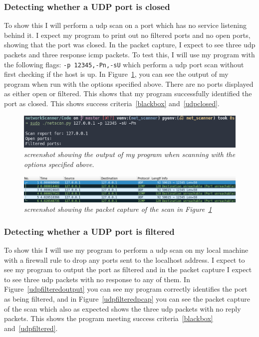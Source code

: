 \documentclass[titlepage]{article}
\let\Oldsubsubsection\subsubsection{}
\renewcommand{\subsubsection}{\FloatBarrier\Oldsubsubsection}
\begin{document}
\subsubsection{Detecting whether a UDP port is closed}
To show this I will perform a \gls{udp} scan on a port which
has no service listening behind it. I expect my program to print out
no filtered ports and no open ports, showing that the port was closed.
In the packet capture, I expect to see three \gls{udp} packets and three response
\gls{icmp} packets. To test this, I will use my program with the following flags:
\verb|-p 12345,-Pn,-sU| which perform a \gls{udp} port scan without first checking
if the host is up. In Figure~\ref{udpclosedoutput}, you can see the output of my program
when run with the options specified above.
There are no ports displayed as either open or filtered.
This shows that my program successfully identified the port as closed.
This shows success criteria~\ref{blackbox} and~\ref{udpclosed}.

\begin{figure}[H]
  \centering
  \includegraphics[width=\textwidth]{udpclosedoutput.png}
  \caption{\textit{%
    screenshot showing the output of my program when scanning with the
    options specified above.
}}\label{udpclosedoutput}
\end{figure}

\begin{figure}[H]
  \centering
  \includegraphics[width=\textwidth]{udpclosedpcap.png}
  \caption{\textit{%
    screenshot showing the packet capture of the scan in Figure~\ref{udpclosedoutput}
}}\label{udpclosedcap}
\end{figure}

\subsubsection{Detecting whether a UDP port is filtered}
To show this I will use my program to perform a \gls{udp} scan on my local machine
with a firewall rule to drop any ports sent to the localhost address. I expect to see
my program to output the port as filtered and in the packet capture I expect to see
three \gls{udp} packets with no response to any of them.
In Figure~\ref{udpfilteredoutput} you can see my program correctly identifies
the port as being filtered, and in Figure~\ref{udpfilteredpcap} you can see
the packet capture of the scan which also as expected shows the three \gls{udp}
packets with no reply packets. This shows the program meeting success criteria~\ref{blackbox}
and~\ref{udpfiltered}.
\end{document}

